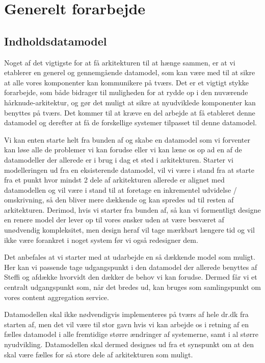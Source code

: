 \documentclass{article}
\begin{document}
\section{Generelt forarbejde}
\subsection{Indholdsdatamodel}
Noget af det vigtigste for at få arkitekturen til at hænge sammen, er at vi etablerer en generel og gennemgående datamodel, som kan være med til at sikre at alle vores komponenter kan kommunikere på tværs. Det er et vigtigt stykke forarbejde, som både bidrager til muligheden for at rydde op i den nuværende hårknude-arkitektur, og gør det muligt at sikre at nyudviklede komponenter kan benyttes på tværs. Det kommer til at kræve en del arbejde at få etableret denne datamodel og derefter at få de forskellige systemer tilpasset til denne datamodel.

Vi kan enten starte helt fra bunden af og skabe en datamodel som vi forventer kan løse alle de problemer vi kan forudse eller vi kan læne os op ad en af de datamodeller der allerede er i brug i dag et sted i arkitekturen. Starter vi modelleringen ud fra en eksisterende datamodel, vil vi være i stand fra at starte fra et punkt hvor mindst 2 dele af arkitekturen allerede er alignet med datamodellen og vil være i stand til at foretage en inkrementel udvidelse / omskrivning, så den bliver mere dækkende og kan spredes ud til resten af arkitekturen. Derimod, hvis vi starter fra bunden af, så kan vi formentligt designe en renere model der lever op til vores ønsker uden at være besværet af unødvendig kompleksitet, men design heraf vil tage mærkbart længere tid og vil ikke være forankret i noget system før vi også redesigner dem.

Det anbefales at vi starter med at udarbejde en så dækkende model som muligt. Her kan vi passende tage udgangspunkt i den datamodel der allerede benyttes af Steffi og afdække hvorvidt den dækker de behov vi kan forudse. Dermed får vi et centralt udgangspunkt som, når det bredes ud, kan bruges som samlingspunkt om vores content aggregation service.  

Datamodellen skal ikke nødvendigvis implementeres på tværs af hele dr.dk fra starten af, men det vil være til stor gavn hvis vi kan arbejde os i retning af en fælles datamodel i alle fremtidige større ændringer af systemerne, samt i al større nyudvikling. Datamodellen skal dermed designes ud fra et synspunkt om at den skal være fælles for så store dele af arkitekturen som muligt.
\end{document}
